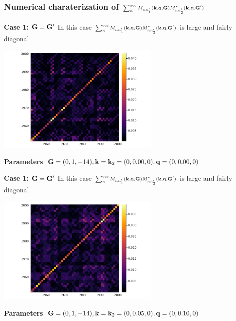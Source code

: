 \documentclass[t]{beamer}
\begin{document}
\begin{frame}[allowframebreaks]
\frametitle{Numerical charaterization of 
$\scriptstyle \sum_{n}^{\text{occ}} M_{n n'_1} (\vb{k}, \vb{q}, \vb{G}) M^*_{nn'_2} (\vb{k}, \vb{q}, \vb{G}') $}

\textbf{Case 1: $\vb{G} = \vb{G}'$}  In this case $\scriptstyle \sum_{n}^{\text{occ}} M_{n n'_1} (\vb{k}, \vb{q}, \vb{G}) M^*_{nn'_2} (\vb{k}, \vb{q}, \vb{G}')$ is large and fairly diagonal

\begin{center}
    \includegraphics[width=0.6\textwidth]{../data/chi/nc_range-1951-2000-k_idx-1-q_idx-1-G_idx-810.png}
\end{center}

\textbf{Parameters} $\vb{G} = (0, 1, -14), \vb{k} = \vb{k}_2 = (0, 0.00, 0), \vb{q} = (0, 0.00, 0)$

\framebreak

\textbf{Case 1: $\vb{G} = \vb{G}'$}  In this case $\scriptstyle \sum_{n}^{\text{occ}} M_{n n'_1} (\vb{k}, \vb{q}, \vb{G}) M^*_{nn'_2} (\vb{k}, \vb{q}, \vb{G}')$ is large and fairly diagonal

\begin{center}
    \includegraphics[width=0.6\textwidth]{../data/chi/nc_range-1951-2000-k_idx-2-q_idx-3-G_idx-810.png}
\end{center}

\textbf{Parameters} $\vb{G} = (0, 1, -14), \vb{k} = \vb{k}_2 = (0, 0.05, 0), \vb{q} = (0, 0.10, 0)$


\end{frame}
\end{document}
